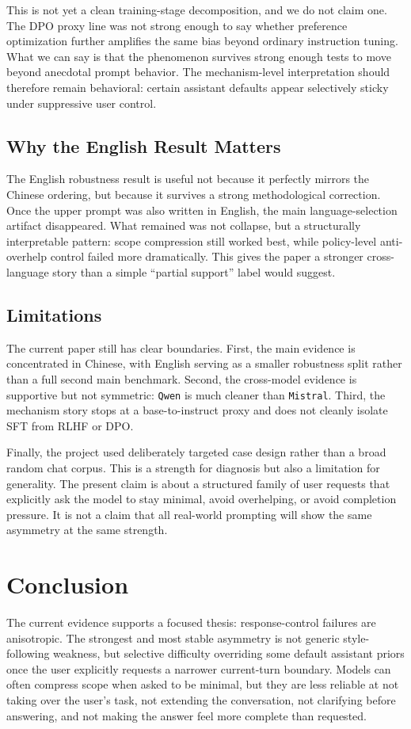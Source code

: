 \documentclass[11pt]{article}
\begin{document}
This is not yet a clean training-stage decomposition, and we do not claim one. The DPO proxy line was not strong enough to say whether preference optimization further amplifies the same bias beyond ordinary instruction tuning. What we can say is that the phenomenon survives strong enough tests to move beyond anecdotal prompt behavior. The mechanism-level interpretation should therefore remain behavioral: certain assistant defaults appear selectively sticky under suppressive user control.

\subsection{Why the English Result Matters}
The English robustness result is useful not because it perfectly mirrors the Chinese ordering, but because it survives a strong methodological correction. Once the upper prompt was also written in English, the main language-selection artifact disappeared. What remained was not collapse, but a structurally interpretable pattern: scope compression still worked best, while policy-level anti-overhelp control failed more dramatically. This gives the paper a stronger cross-language story than a simple ``partial support'' label would suggest.

\subsection{Limitations}
The current paper still has clear boundaries. First, the main evidence is concentrated in Chinese, with English serving as a smaller robustness split rather than a full second main benchmark. Second, the cross-model evidence is supportive but not symmetric: \texttt{Qwen} is much cleaner than \texttt{Mistral}. Third, the mechanism story stops at a base-to-instruct proxy and does not cleanly isolate SFT from RLHF or DPO.

Finally, the project used deliberately targeted case design rather than a broad random chat corpus. This is a strength for diagnosis but also a limitation for generality. The present claim is about a structured family of user requests that explicitly ask the model to stay minimal, avoid overhelping, or avoid completion pressure. It is not a claim that all real-world prompting will show the same asymmetry at the same strength.

\section{Conclusion}
The current evidence supports a focused thesis: response-control failures are anisotropic. The strongest and most stable asymmetry is not generic style-following weakness, but selective difficulty overriding some default assistant priors once the user explicitly requests a narrower current-turn boundary. Models can often compress scope when asked to be minimal, but they are less reliable at not taking over the user's task, not extending the conversation, not clarifying before answering, and not making the answer feel more complete than requested.
\end{document}
